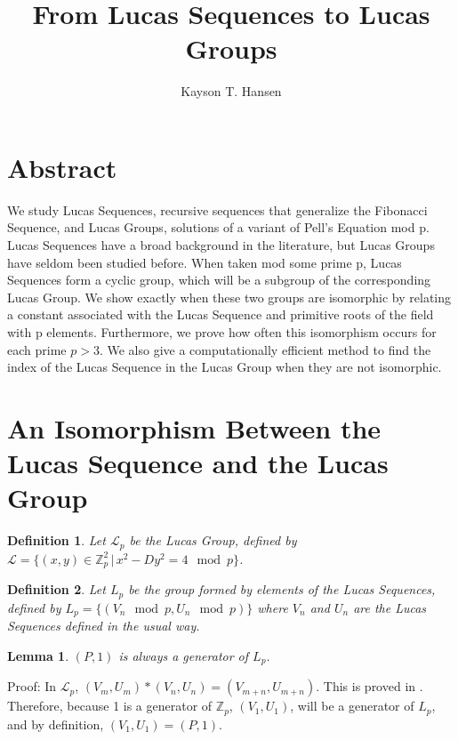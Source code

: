 \documentclass{article}
\newtheorem{lemma}{Lemma}
\newtheorem{definition}{Definition}
\begin{document}
\title{From Lucas Sequences to Lucas Groups}
\author{Kayson T. Hansen}

\maketitle

\section{Abstract}

We study Lucas Sequences, recursive sequences that generalize the Fibonacci Sequence, and Lucas Groups, solutions of a variant of Pell’s Equation mod p. Lucas Sequences have a broad background in the literature, but Lucas Groups have seldom been studied before. When taken mod some prime p, Lucas Sequences form a cyclic group, which will be a subgroup of the corresponding Lucas Group. We show exactly when these two groups are isomorphic by relating a constant associated with the Lucas Sequence and primitive roots of the field with p elements. Furthermore, we prove how often this isomorphism occurs for each prime $p > 3$. We also give a computationally efficient method to find the index of the Lucas Sequence in the Lucas Group when they are not isomorphic. 

\section{An Isomorphism Between the Lucas Sequence and the Lucas Group}

\begin{definition}
Let $\mathcal{L}_p$ be the Lucas Group, defined by $\mathcal{L} = \{ (x,y) \in \mathbb{Z}_p^2 \,|\, x^2-Dy^2 = 4 \mod p \}$.
\end{definition}

\begin{definition}
Let $L_p$ be the group formed by elements of the Lucas Sequences, defined by $L_p = \{(V_n \mod p, U_n \mod p)\}$ where $V_n$ and $U_n$ are the Lucas Sequences defined in the usual way.
\end{definition}

\begin{lemma}
$(P,1)$ is always a generator of $L_p$.
\end{lemma}

Proof: In $\mathcal{L}_p$, $(V_m, U_m)*(V_n, U_n) = (V_{m+n}, U_{m+n})$. This is proved in \cite{hinkel}. Therefore, because 1 is a generator of $\mathbb{Z}_p$, $(V_1, U_1)$, will be a generator of $L_p$, and by definition, $(V_1, U_1) = (P,1)$.
\end{document}
